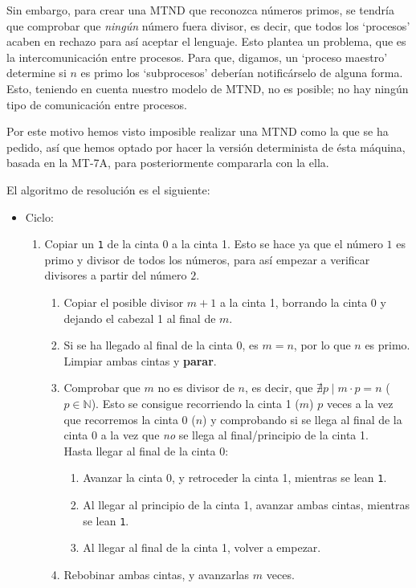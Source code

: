 Sin embargo, para crear una MTND que reconozca números primos, se tendría que comprobar que \textit{ningún} número fuera divisor, es decir, que todos los `procesos' acaben en rechazo para así aceptar el lenguaje. Esto plantea un problema, que es la intercomunicación entre procesos. Para que, digamos, un `proceso maestro' determine si $n$ es primo los `subprocesos' deberían notificárselo de alguna forma.\\
Esto, teniendo en cuenta nuestro modelo de MTND, no es posible; no hay ningún tipo de comunicación entre procesos.\medskip

Por este motivo hemos visto imposible realizar una MTND como la que se ha pedido, así que hemos optado por hacer la versión determinista de ésta máquina, basada en la MT-7A, para posteriormente compararla con la ella.\bigskip

El algoritmo de resolución es el siguiente:
\begin{itemize}
    \item Ciclo:
    \begin{enumerate}
        \item Copiar un \texttt{1} de la cinta 0 a la cinta 1. Esto se hace ya que el número $1$ es primo y divisor de todos los números, para así empezar a verificar divisores a partir del número $2$.
        \begin{enumerate}
            \item Copiar el posible divisor $m+1$ a la cinta 1, borrando la cinta 0 y dejando el cabezal 1 al final de $m$.
            \item Si se ha llegado al final de la cinta 0, es $m=n$, por lo que $n$ es primo. Limpiar ambas cintas y \textbf{parar}.
            \item Comprobar que $m$ no es divisor de $n$, es decir, que $\nexists p \mid m\cdot p = n$ ($p \in \mathbb{N}$). Esto se consigue recorriendo la cinta 1 ($m$) $p$ veces a la vez que recorremos la cinta 0 ($n$) y comprobando si se llega al final de la cinta 0 a la vez que \textit{no} se llega al final/principio de la cinta 1.\\
            Hasta llegar al final de la cinta 0:
            \begin{enumerate}[1.]
                \item Avanzar la cinta 0, y retroceder la cinta 1, mientras se lean \texttt{1}.
                \item Al llegar al principio de la cinta 1, avanzar ambas cintas, mientras se lean \texttt{1}.
                \item Al llegar al final de la cinta 1, volver a empezar.
            \end{enumerate}
            \item Rebobinar ambas cintas, y avanzarlas $m$ veces.
        \end{enumerate}
    \end{enumerate}
\end{itemize}

